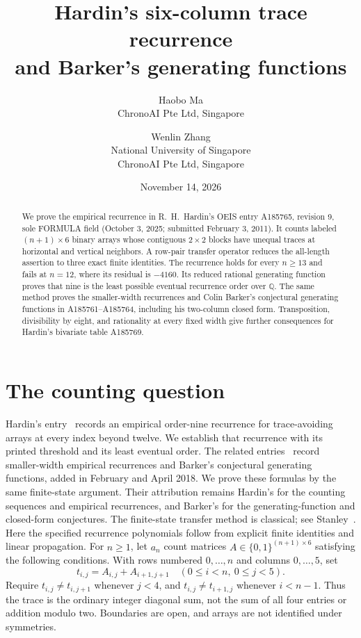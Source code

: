 \documentclass[11pt]{article}
\title{Hardin's six-column trace recurrence\\and Barker's generating functions}
\author{Haobo Ma\\\small ChronoAI Pte Ltd, Singapore
\and Wenlin Zhang\\\small National University of Singapore\\\small ChronoAI Pte Ltd, Singapore}
\date{November 14, 2026}
\begin{document}
\maketitle
\begin{abstract}
We prove the empirical recurrence in R.\ H.\ Hardin's OEIS entry
A185765, revision 9, sole FORMULA field (October 3, 2025; submitted
February 3, 2011). It counts labeled $(n+1)\times6$ binary arrays whose
contiguous $2\times2$ blocks have unequal traces at horizontal and vertical
neighbors. A row-pair transfer operator reduces the all-length assertion to
three exact finite identities. The recurrence holds for every $n\geq13$
and fails at $n=12$, where its residual is $-4160$. Its reduced rational
generating function proves that nine is the least possible eventual
recurrence order over $\mathbb Q$. The same method proves the smaller-width
recurrences and Colin Barker's conjectural generating functions in
A185761--A185764, including his two-column closed form. Transposition,
divisibility by eight, and rationality at every fixed width give further
consequences for Hardin's bivariate table A185769.
\end{abstract}

\section{The counting question}
Hardin's entry~\cite{hardin765} records an empirical order-nine recurrence
for trace-avoiding arrays at every index beyond twelve. We establish
that recurrence with its printed threshold and its least eventual order.
The related entries~\cite{hardin761,hardin762,hardin763,hardin764} record
smaller-width empirical recurrences and Barker's conjectural generating
functions, added in February and April 2018. We prove these formulas by
the same finite-state argument. Their attribution remains Hardin's for
the counting sequences and empirical recurrences, and Barker's for the
generating-function and closed-form conjectures.
The finite-state transfer method is classical; see Stanley~\cite[Section~4.7]{stanley}.
Here the specified recurrence polynomials follow from explicit finite
identities and linear propagation.
For $n\geq1$, let $a_n$ count matrices
$A\in\{0,1\}^{(n+1)\times6}$ satisfying the following conditions.
With rows numbered $0,\ldots,n$ and columns $0,\ldots,5$, set
\[
 t_{i,j}=A_{i,j}+A_{i+1,j+1}\quad(0\leq i<n,\ 0\leq j<5).
\]
Require $t_{i,j}\ne t_{i,j+1}$ whenever $j<4$, and
$t_{i,j}\ne t_{i+1,j}$ whenever $i<n-1$.
Thus the trace is the ordinary integer diagonal sum, not the sum of all
four entries or addition modulo two. Boundaries are open, and arrays are
not identified under symmetries.
\end{document}
